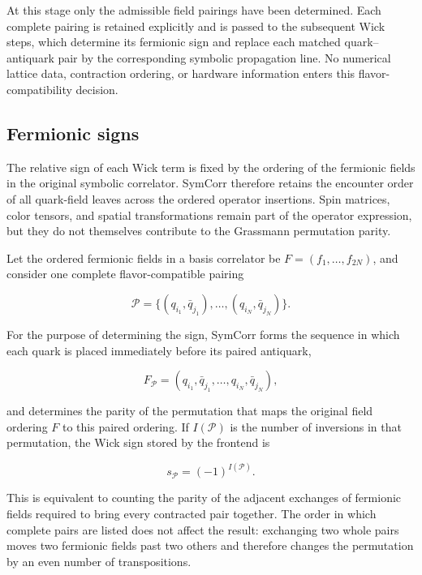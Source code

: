 \documentclass[11pt]{article}
\begin{document}
At this stage only the admissible field pairings have been determined. Each
complete pairing is retained explicitly and is passed to the subsequent Wick
steps, which determine its fermionic sign and replace each matched
quark--antiquark pair by the corresponding symbolic propagation line. No
numerical lattice data, contraction ordering, or hardware information enters
this flavor-compatibility decision.

\subsection{Fermionic signs}

The relative sign of each Wick term is fixed by the ordering of the fermionic
fields in the original symbolic correlator. SymCorr therefore retains the
encounter order of all quark-field leaves across the ordered operator
insertions. Spin matrices, color tensors, and spatial transformations remain
part of the operator expression, but they do not themselves contribute to the
Grassmann permutation parity.

Let the ordered fermionic fields in a basis correlator be
\(F=(f_1,\ldots,f_{2N})\), and consider one complete flavor-compatible pairing

\begin{equation}
\mathcal P
=
\bigl\{
(q_{i_1},\bar q_{j_1}),\ldots,
(q_{i_N},\bar q_{j_N})
\bigr\}.
\end{equation}

For the purpose of determining the sign, SymCorr forms the sequence in which
each quark is placed immediately before its paired antiquark,

\begin{equation}
F_{\mathcal P}
=
(q_{i_1},\bar q_{j_1},\ldots,
 q_{i_N},\bar q_{j_N}),
\end{equation}

and determines the parity of the permutation that maps the original field
ordering \(F\) to this paired ordering. If \(I(\mathcal P)\) is the number of
inversions in that permutation, the Wick sign stored by the frontend is

\begin{equation}
s_{\mathcal P}=(-1)^{I(\mathcal P)}.
\label{eq:wick_fermionic_sign}
\end{equation}

This is equivalent to counting the parity of the adjacent exchanges of
fermionic fields required to bring every contracted pair together. The order
in which complete pairs are listed does not affect the result: exchanging two
whole pairs moves two fermionic fields past two others and therefore changes
the permutation by an even number of transpositions.
\end{document}
